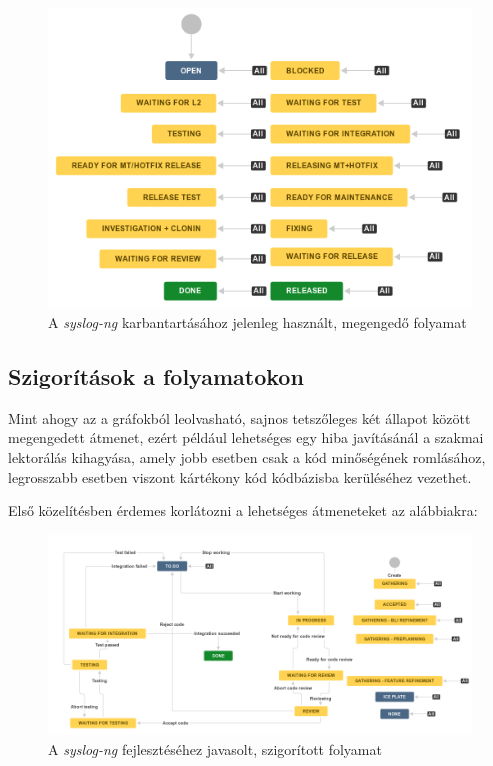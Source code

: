 \begin{figure}[h]
    \includegraphics[width=\textwidth, height=0.4\textheight, keepaspectratio]{figures/oldmt.png}
    \centering
    \caption{A \emph{syslog-ng} karbantartásához jelenleg használt, megengedő folyamat}
    \label{fig:oldmt}
\end{figure}

\FloatBarrier
\pagebreak[3]
\subsection{Szigorítások a folyamatokon}

Mint ahogy az a gráfokból leolvasható, sajnos tetszőleges két állapot között megengedett átmenet,
ezért például lehetséges egy hiba javításánál a szakmai lektorálás kihagyása, amely jobb esetben
csak a kód minőségének romlásához, legrosszabb esetben viszont kártékony kód kódbázisba kerüléséhez
vezethet.

Első közelítésben érdemes korlátozni a lehetséges átmeneteket az alábbiakra:

\begin{figure}[h]
    \includegraphics[width=\textwidth, keepaspectratio]{figures/newfeature.png}
    \centering
    \caption{A \emph{syslog-ng} fejlesztéséhez javasolt, szigorított folyamat}
    \label{fig:newfeature}
\end{figure}

